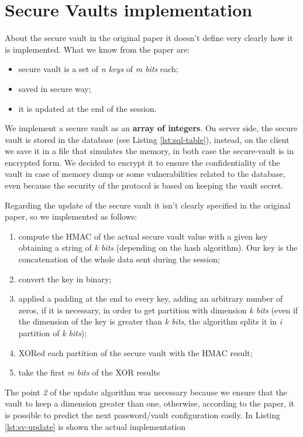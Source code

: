 \section{Secure Vaults implementation}
About the secure vault in the original paper it doesn't define very clearly how it is implemented. What we know from the paper are:
\begin{itemize}
    \item secure vault is a set of \textit{n keys} of \textit{m bits} each;
    \item saved in secure way;
    \item it is updated at the end of the session.
\end{itemize}
We implement a secure vault as an \textbf{array of integers}. On server side, the secure vault is stored in the database (see Listing \ref{lst:sql-table}), instead, on the client we save it in a file that simulates the memory, in both case the secure-vault is in encrypted form. We decided to encrypt it to ensure the confidentiality of the vault in case of memory dump or some vulnerabilities related to the database, even because the security of the protocol is based on keeping the vault secret.

Regarding the update of the secure vault it isn't clearly specified in the original paper, so we implemented as follows:
\begin{enumerate}
    \item compute the HMAC of the actual secure vault value with a given key obtaining a string of \textit{k bits} (depending on the hash algorithm). Our key is the concatenation of the whole data sent during the session;
    \item convert the key in binary;
    \item applied a padding at the end to every key, adding an arbitrary number of zeros, if it is necessary, in order to get partition with dimension \textit{k bits} (even if the dimension of the key is greater than \textit{k bits}, the algorithm splits it in \textit{i} partition of \textit{k bits});
    \item XORed each partition of the secure vault with the HMAC result;
    \item  take the first \textit{m bits} of the XOR results
\end{enumerate}
The point \textit{2} of the update algorithm was necessary because we ensure that the vault to keep a dimension greater than one, otherwise, according to the paper, it is possible to predict the next password/vault configuration easily. 
In Listing \ref{lst:sv-update} is shown the actual implementation

